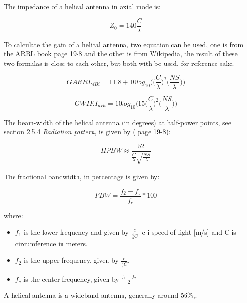 The impedance of a helical antenna in axial mode is: 

\begin{equation}
   Z_0 = 140\frac{C}{\lambda}
\end{equation}

To calculate the gain of a helical antenna, two equation can be used, one is from the ARRL book\cite{ARRL} page 19-8 and the other is from Wikipedia\cite{HelicalAntennaWiki}, the result of these two formulas is close to each other, but both with be used, for reference sake.  

\begin{equation}
   GARRL_{dBi} = 11.8+10log_{10}\Big(\Big(\frac{C}{\lambda}\Big)^2\Big(\frac{NS}{\lambda}\Big)\Big)
\end{equation}

\begin{equation}
   GWIKI_{dBi} = 10log_{10}\Big(15\Big(\frac{C}{\lambda}\Big)^2\Big(\frac{NS}{\lambda}\Big)\Big)
\end{equation}

The beam-width of the helical antenna (in degrees) at half-power points, see section 2.5.4 \textit{Radiation pattern}, is given by (\cite{ARRL} page 19-8):

\begin{equation}
   HPBW \approx \frac{52}{\frac{C}{\lambda}\sqrt{\frac{NS}{\lambda}}}
\end{equation}

The fractional bandwidth, in percentage is given by:

\begin{equation}
   FBW =\frac{f_2-f_1}{f_c}*100 
\end{equation}

where:

\begin{itemize}
  \item $f_1$ is the lower frequency and given by $\frac{c}{\frac{4}{3}C}$, c i speed of light [m/s] and C is circumference in meters.
  \item $f_2$ is the upper frequency, given by $\frac{c}{\frac{3}{4}C}$.
  \item $f_c$ is the center frequency, given by $\frac{f_1+f_2}{2}$ 
\end{itemize}

A helical antenna is a wideband antenna, generally around 56\%,\cite{AntennaTheoryBandwidth}.

